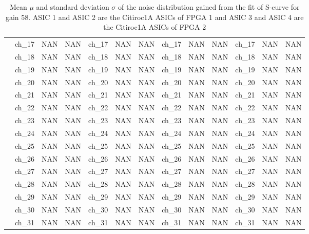\begin{table}
{\begin{tabular}{|c|c|c|c|c|c|c|c|c|c|c|c|c|}
        &ch\_17 & NAN & NAN & ch\_17 & NAN & NAN & ch\_17 & NAN & NAN & ch\_17 & NAN & NAN \\
        &ch\_18 & NAN & NAN & ch\_18 & NAN & NAN & ch\_18 & NAN & NAN & ch\_18 & NAN & NAN \\
        &ch\_19 & NAN & NAN & ch\_19 & NAN & NAN & ch\_19 & NAN & NAN & ch\_19 & NAN & NAN \\
        &ch\_20 & NAN & NAN & ch\_20 & NAN & NAN & ch\_20 & NAN & NAN & ch\_20 & NAN & NAN \\
        &ch\_21 & NAN & NAN & ch\_21 & NAN & NAN & ch\_21 & NAN & NAN & ch\_21 & NAN & NAN \\
        &ch\_22 & NAN & NAN & ch\_22 & NAN & NAN & ch\_22 & NAN & NAN & ch\_22 & NAN & NAN \\
        &ch\_23 & NAN & NAN & ch\_23 & NAN & NAN & ch\_23 & NAN & NAN & ch\_23 & NAN & NAN \\
        &ch\_24 & NAN & NAN & ch\_24 & NAN & NAN & ch\_24 & NAN & NAN & ch\_24 & NAN & NAN \\
        &ch\_25 & NAN & NAN & ch\_25 & NAN & NAN & ch\_25 & NAN & NAN & ch\_25 & NAN & NAN \\
        &ch\_26 & NAN & NAN & ch\_26 & NAN & NAN & ch\_26 & NAN & NAN & ch\_26 & NAN & NAN \\
        &ch\_27 & NAN & NAN & ch\_27 & NAN & NAN & ch\_27 & NAN & NAN & ch\_27 & NAN & NAN \\
        &ch\_28 & NAN & NAN & ch\_28 & NAN & NAN & ch\_28 & NAN & NAN & ch\_28 & NAN & NAN \\
        &ch\_29 & NAN & NAN & ch\_29 & NAN & NAN & ch\_29 & NAN & NAN & ch\_29 & NAN & NAN \\
        &ch\_30 & NAN & NAN & ch\_30 & NAN & NAN & ch\_30 & NAN & NAN & ch\_30 & NAN & NAN \\
        &ch\_31 & NAN & NAN & ch\_31 & NAN & NAN & ch\_31 & NAN & NAN & ch\_31 & NAN & NAN \\
        \hline
    \end{tabular}
    }
    \caption{Mean $\mu$ and standard deviation $\sigma$ of the noise distribution gained from the fit of S-curve for gain 58. ASIC 1 and ASIC 2 are the Citiroc1A ASICs of FPGA 1 and ASIC 3 and ASIC 4 are the Citiroc1A ASICs of FPGA 2}
    \label{tab:noise_parameter_2}
\end{table}